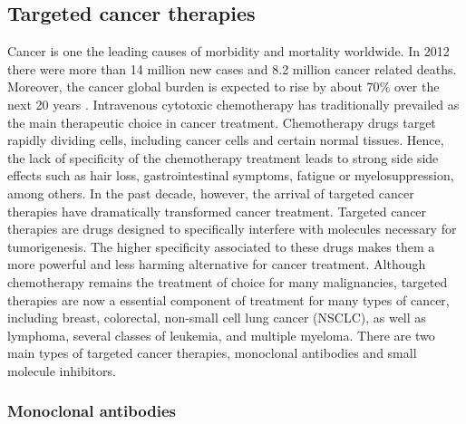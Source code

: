 \documentclass[12pt, b5paper,twoside]{tesi_upf}
\begin{document}
\subsection{Targeted cancer therapies}\label{targeted therapies}

\par Cancer is one the leading causes of morbidity and mortality worldwide. In 2012 there were more than 14 million new cases and 8.2 million cancer related deaths. Moreover, the cancer global burden is expected to rise by about 70$\%$ over the next 20 years \cite{WHO_CANCER}. Intravenous cytotoxic chemotherapy has traditionally prevailed as the main therapeutic choice in cancer treatment. Chemotherapy drugs target rapidly dividing cells, including cancer cells and certain normal tissues.  Hence, the lack of specificity of the chemotherapy treatment leads to strong side side effects such as hair loss, gastrointestinal symptoms, fatigue or myelosuppression, among others.  In the past decade, however, the arrival of targeted cancer therapies have dramatically transformed cancer treatment. Targeted cancer therapies are drugs designed to specifically interfere with molecules necessary for tumorigenesis. The higher specificity associated to these drugs makes them a more powerful and less harming alternative for cancer treatment. Although chemotherapy remains the treatment of choice for many malignancies, targeted therapies are now a essential component of treatment for many types of cancer, including breast, colorectal, non-small cell lung cancer (NSCLC), as well as lymphoma, several classes of leukemia, and multiple myeloma. There are two main types of targeted cancer therapies, monoclonal antibodies and small molecule inhibitors.

\subsubsection{Monoclonal antibodies}
\end{document}
